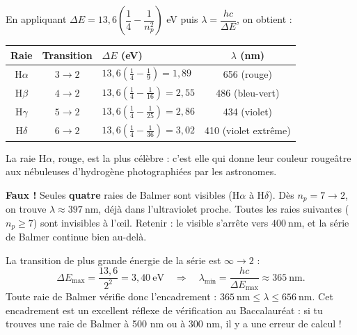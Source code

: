 \documentclass[11pt]{article}
\begin{document}
\begin{exemplebox}
En appliquant $\Delta E = 13{,}6\left(\dfrac{1}{4} - \dfrac{1}{n_p^2}\right)$ eV puis $\lambda = \dfrac{hc}{\Delta E}$, on obtient :
\begin{center}
\begin{tabularx}{\linewidth}{|c|c|X|c|}\hline
\rowcolor{popblueL} \textbf{Raie} & \textbf{Transition} & \textbf{$\Delta E$ (eV)} & \textbf{$\lambda$ (nm)} \\ \hline
H$\alpha$ & $3 \to 2$ & $13{,}6\left(\tfrac14-\tfrac19\right)=1{,}89$ & 656 (rouge) \\ \hline
H$\beta$ & $4 \to 2$ & $13{,}6\left(\tfrac14-\tfrac1{16}\right)=2{,}55$ & 486 (bleu-vert) \\ \hline
H$\gamma$ & $5 \to 2$ & $13{,}6\left(\tfrac14-\tfrac1{25}\right)=2{,}86$ & 434 (violet) \\ \hline
H$\delta$ & $6 \to 2$ & $13{,}6\left(\tfrac14-\tfrac1{36}\right)=3{,}02$ & 410 (violet extrême) \\ \hline
\end{tabularx}
\end{center}
La raie H$\alpha$, rouge, est la plus célèbre : c'est elle qui donne leur couleur rougeâtre aux nébuleuses d'hydrogène photographiées par les astronomes.
\end{exemplebox}

\begin{attention}
\textbf{Faux !} Seules \textbf{quatre} raies de Balmer sont visibles (H$\alpha$ à H$\delta$). Dès $n_p = 7 \to 2$, on trouve $\lambda \approx 397\ \text{nm}$, déjà dans l'ultraviolet proche. Toutes les raies suivantes ($n_p \geq 7$) sont invisibles à l'œil. Retenir : le visible s'arrête vers $400\ \text{nm}$, et la série de Balmer continue bien au-delà.
\end{attention}

\begin{exemplebox}
La transition de plus grande énergie de la série est $\infty \to 2$ :
\[ \Delta E_{\max} = \frac{13{,}6}{2^2} = 3{,}40\ \text{eV} \quad\Longrightarrow\quad \lambda_{\min} = \frac{hc}{\Delta E_{\max}} \approx 365\ \text{nm}. \]
Toute raie de Balmer vérifie donc l'encadrement : $\boxed{365\ \text{nm} \leq \lambda \leq 656\ \text{nm}}$. Cet encadrement est un excellent réflexe de vérification au Baccalauréat : si tu trouves une raie de Balmer à 500 nm ou à 300 nm, il y a une erreur de calcul !
\end{exemplebox}
\end{document}
